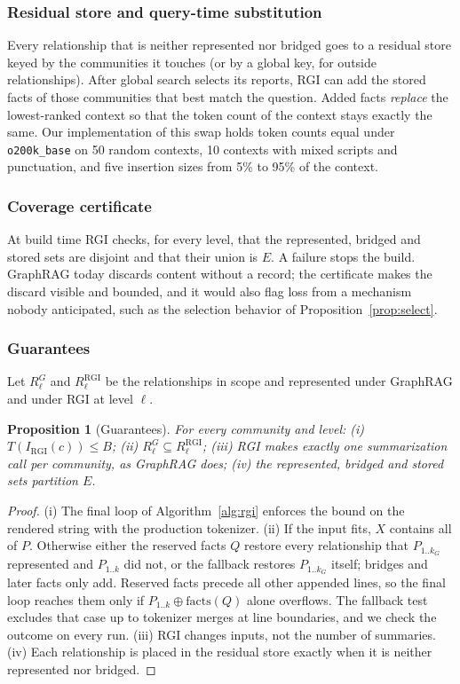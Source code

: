 \documentclass{ieeeaccess}
\newtheorem{proposition}{Proposition}
\theoremstyle{remark}
\newcommand{\In}{I}
\newcommand{\tok}{T}
\begin{document}
\subsubsection{Residual store and query-time substitution}
Every relationship that is neither represented nor bridged goes to a residual store keyed by the communities it touches (or by a global key, for outside relationships). After global search selects its reports, RGI can add the stored facts of those communities that best match the question. Added facts \emph{replace} the lowest-ranked context so that the token count of the context stays exactly the same. Our implementation of this swap holds token counts equal under \texttt{o200k\_base} on 50 random contexts, 10 contexts with mixed scripts and punctuation, and five insertion sizes from 5\% to 95\% of the context.

\subsubsection{Coverage certificate}
At build time RGI checks, for every level, that the represented, bridged and stored sets are disjoint and that their union is $E$. A failure stops the build. GraphRAG today discards content without a record; the certificate makes the discard visible and bounded, and it would also flag loss from a mechanism nobody anticipated, such as the selection behavior of Proposition~\ref{prop:select}.

\subsubsection{Guarantees}
Let $R^G_\ell$ and $R^{\mathrm{RGI}}_\ell$ be the relationships in scope and represented under GraphRAG and under RGI at level $\ell$.

\begin{proposition}[Guarantees]\label{prop:guarantees}
For every community and level: (i) $\tok(\In_{\mathrm{RGI}}(c))\le B$; (ii) $R^G_\ell\subseteq R^{\mathrm{RGI}}_\ell$; (iii) RGI makes exactly one summarization call per community, as GraphRAG does; (iv) the represented, bridged and stored sets partition $E$.
\end{proposition}
\begin{proof}
(i) The final loop of Algorithm~\ref{alg:rgi} enforces the bound on the rendered string with the production tokenizer. (ii) If the input fits, $X$ contains all of $P$. Otherwise either the reserved facts $Q$ restore every relationship that $P_{1..k_G}$ represented and $P_{1..k}$ did not, or the fallback restores $P_{1..k_G}$ itself; bridges and later facts only add. Reserved facts precede all other appended lines, so the final loop reaches them only if $P_{1..k}\oplus\mathrm{facts}(Q)$ alone overflows. The fallback test excludes that case up to tokenizer merges at line boundaries, and we check the outcome on every run. (iii) RGI changes inputs, not the number of summaries. (iv) Each relationship is placed in the residual store exactly when it is neither represented nor bridged.
\end{proof}
\end{document}
